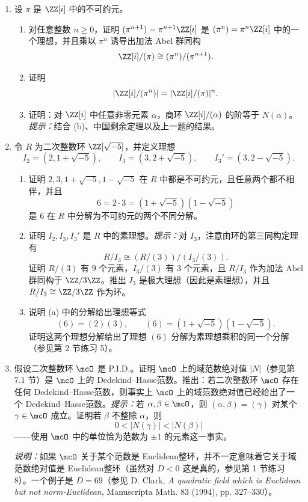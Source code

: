 \begin{enumerate}[label=\arabic*.]
	\item 设 $\pi$ 是 $\ZZ[i]$ 中的不可约元。
	\begin{enumerate}[label=(\alph*)]
		\item 对任意整数 $n\geq0$，证明 $(\pi^{n+1})=\pi^{n+1}\ZZ[i]$ 是 $(\pi^n)=\pi^n\ZZ[i]$ 中的一个理想，并且乘以 $\pi^n$ 诱导出加法 Abel 群同构
		\[
		\ZZ[i]/(\pi)\cong (\pi^n)/(\pi^{n+1}).
		\]
		\item 证明
		\[
		|\ZZ[i]/(\pi^n)|=|\ZZ[i]/(\pi)|^n.
		\]
		\item 证明：对 $\ZZ[i]$ 中任意非零元素 $\alpha$，商环 $\ZZ[i]/(\alpha)$ 的阶等于 $N(\alpha)$。\emph{提示：}结合 (b)、中国剩余定理以及上一题的结果。
	\end{enumerate}
	
	\item 令 $R$ 为二次整数环 $\ZZ[\sqrt{-5}]$，并定义理想
	\[
	I_2=(2,1+\sqrt{-5}),\qquad
	I_3=(3,2+\sqrt{-5}),\qquad
	I_3'=(3,2-\sqrt{-5}).
	\]
	\begin{enumerate}[label=(\alph*)]
		\item 证明 $2,3,1+\sqrt{-5},1-\sqrt{-5}$ 在 $R$ 中都是不可约元，且任意两个都不相伴，并且
		\[
		6=2\cdot3=(1+\sqrt{-5})(1-\sqrt{-5})
		\]
		是 $6$ 在 $R$ 中分解为不可约元的两个不同分解。
		\item 证明 $I_2,I_3,I_3'$ 是 $R$ 中的素理想。\emph{提示：}对 $I_3$，注意由环的第三同构定理有
		\[
		R/I_3\cong (R/(3))/(I_3/(3)).
		\]
		证明 $R/(3)$ 有 $9$ 个元素，$I_3/(3)$ 有 $3$ 个元素，且 $R/I_3$ 作为加法 Abel 群同构于 $\ZZ/3\ZZ$。推出 $I_3$ 是极大理想（因此是素理想），并且 $R/I_3\cong \ZZ/3\ZZ$ 作为环。
		\item 说明 (a) 中的分解给出理想等式
		\[
		(6)=(2)(3),\qquad
		(6)=(1+\sqrt{-5})(1-\sqrt{-5}).
		\]
		证明这两个理想分解给出了理想 $(6)$ 分解为素理想乘积的同一个分解（参见第 2 节练习 5）。
	\end{enumerate}
	
	\item 假设二次整数环 $\mcO$ 是 P.I.D.。证明 $\mcO$ 上的域范数绝对值 $|N|$（参见第 7.1 节）是 $\mcO$ 上的 Dedekind--Hasse范数。推出：若二次整数环 $\mcO$ 存在任何 Dedekind--Hasse范数，则事实上 $\mcO$ 上的域范数绝对值已经给出了一个 Dedekind--Hasse范数。\emph{提示：}若 $\alpha,\beta\in\mcO$，则 $(\alpha,\beta)=(\gamma)$ 对某个 $\gamma\in\mcO$ 成立。证明若 $\beta$ 不整除 $\alpha$，则
	\[
	0<|N(\gamma)|<|N(\beta)|
	\]
	——使用 $\mcO$ 中的单位恰为范数为 $\pm1$ 的元素这一事实。
	
	\noindent\emph{说明：}如果 $\mcO$ 关于某个范数是 Euclidean整环，并不一定意味着它关于域范数绝对值是 Euclidean整环（虽然对 $D<0$ 这是真的，参见第 1 节练习 8）。一个例子是 $D=69$（参见 D. Clark, \emph{A quadratic field which is Euclidean but not norm-Euclidean}, Manuscripta Math. 83 (1994), pp. 327--330）。
	

\end{enumerate}
